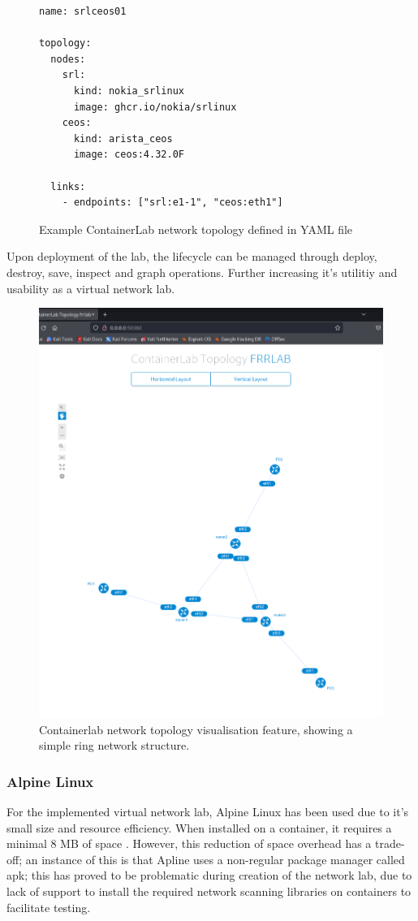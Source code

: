 \begin{figure}
    \centering
    \begin{lstlisting}
name: srlceos01

topology:
  nodes:
    srl:
      kind: nokia_srlinux
      image: ghcr.io/nokia/srlinux
    ceos:
      kind: arista_ceos
      image: ceos:4.32.0F

  links:
    - endpoints: ["srl:e1-1", "ceos:eth1"]
\end{lstlisting}
    \caption{Example ContainerLab network topology defined in YAML file}
    \label{fig:topology_yml}
\end{figure}

Upon deployment of the lab, the lifecycle can be managed through deploy, destroy, save, inspect and graph operations. Further increasing it's utilitiy and usability as a virtual network lab.

\begin{figure}
    \centering
    \includegraphics[width=0.5\linewidth]{images/ring_containerlab.png}
    \caption{Containerlab network topology visualisation feature, showing a simple ring network structure.}
    \label{fig:ring_container}
\end{figure}

\subsubsection{Alpine Linux}
For the implemented virtual network lab, Alpine Linux has been used due to it's small size and resource efficiency. When installed on a container, it  requires a minimal 8 MB of space \cite{alpine}. However, this reduction of space overhead has a trade-off; an instance of this is that Apline uses a non-regular package manager called apk; this has proved to be problematic during creation of the network lab, due to lack of support to install the required network scanning libraries on containers to facilitate testing. 

